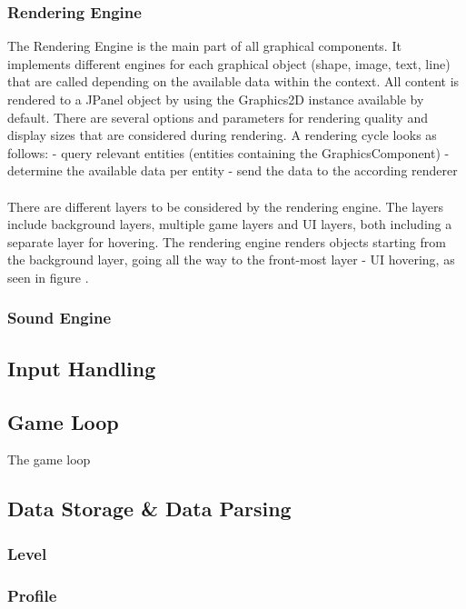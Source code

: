 \subsubsection{Rendering Engine}\label{subsubsec:graphics-engine}
The Rendering Engine is the main part of all graphical components.
It implements different engines for each graphical object (shape, image, text, line) that are called depending on the available data within the
context.
All content is rendered to a JPanel object by using the Graphics2D instance available by default.
There are several options and parameters for rendering quality and display sizes that are considered during rendering.
A rendering cycle looks as follows:
- query relevant entities (entities containing the GraphicsComponent)
- determine the available data per entity
- send the data to the according renderer
\\ \\
There are different layers to be considered by the rendering engine.
The layers include background layers, multiple game layers and UI layers, both including a separate layer for hovering.
The rendering engine renders objects starting from the background layer, going all the way to the front-most layer - UI hovering, as seen in figure
.

\subsubsection{Sound Engine}\label{subsubsec:sound-engine}

\subsection{Input Handling}\label{subsec:input-handling}

\subsection{Game Loop}
The game loop
\subsection{Data Storage \& Data Parsing}
\subsubsection{Level}
\subsubsection{Profile}
